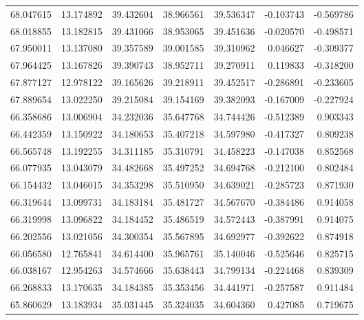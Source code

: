 \begin{tabular}{rrrrrrr}
 68.047615 &  13.174892 &         39.432604 &         38.966561 &         39.536347 & -0.103743 & -0.569786 \\
 68.018855 &  13.182815 &         39.431066 &         38.953065 &         39.451636 & -0.020570 & -0.498571 \\
 67.950011 &  13.137080 &         39.357589 &         39.001585 &         39.310962 &  0.046627 & -0.309377 \\
 67.964425 &  13.167826 &         39.390743 &         38.952711 &         39.270911 &  0.119833 & -0.318200 \\
 67.877127 &  12.978122 &         39.165626 &         39.218911 &         39.452517 & -0.286891 & -0.233605 \\
 67.889654 &  13.022250 &         39.215084 &         39.154169 &         39.382093 & -0.167009 & -0.227924 \\
 66.358686 &  13.006904 &         34.232036 &         35.647768 &         34.744426 & -0.512389 &  0.903343 \\
 66.442359 &  13.150922 &         34.180653 &         35.407218 &         34.597980 & -0.417327 &  0.809238 \\
 66.565748 &  13.192255 &         34.311185 &         35.310791 &         34.458223 & -0.147038 &  0.852568 \\
 66.077935 &  13.043079 &         34.482668 &         35.497252 &         34.694768 & -0.212100 &  0.802484 \\
 66.154432 &  13.046015 &         34.353298 &         35.510950 &         34.639021 & -0.285723 &  0.871930 \\
 66.319644 &  13.099731 &         34.183184 &         35.481727 &         34.567670 & -0.384486 &  0.914058 \\
 66.319998 &  13.096822 &         34.184452 &         35.486519 &         34.572443 & -0.387991 &  0.914075 \\
 66.202556 &  13.021056 &         34.300354 &         35.567895 &         34.692977 & -0.392622 &  0.874918 \\
 66.056580 &  12.765841 &         34.614400 &         35.965761 &         35.140046 & -0.525646 &  0.825715 \\
 66.038167 &  12.954263 &         34.574666 &         35.638443 &         34.799134 & -0.224468 &  0.839309 \\
 66.268833 &  13.170635 &         34.184385 &         35.353456 &         34.441971 & -0.257587 &  0.911484 \\
 65.860629 &  13.183934 &         35.031445 &         35.324035 &         34.604360 &  0.427085 &  0.719675 \\

\end{tabular}
